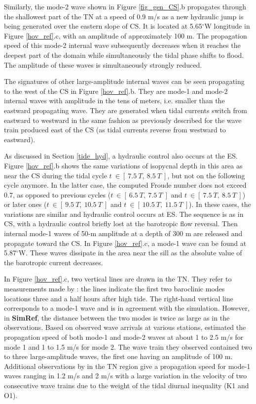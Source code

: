 Similarly, the mode-2 wave shown in Figure \ref{fig_gen_CS}.b propagates through the shallowest part of the TN at a speed of 0.9 m/s as a new hydraulic jump is being generated over the eastern slope of CS. It is located at 5.65$^\circ$W longitude in Figure \ref{hov_ref}.c, with an amplitude of approximately 100 m. The propagation speed of this mode-2 internal wave subsequently decreases when it reaches the deepest part of the domain while simultaneously the tidal phase shifts to flood. The amplitude of these waves is simultaneously strongly reduced.

The signatures of other large-amplitude internal waves can be seen propagating to the west of the CS in Figure \ref{hov_ref}.b. They are mode-1 and mode-2 internal waves with amplitude in the tens of meters, i.e. smaller than the eastward propagating wave. They are generated when tidal currents switch from eastward to westward in the same fashion as previously described for the wave train produced east of the CS (as tidal currents reverse from westward to eastward).

As discussed in Section \ref{tide_hyd}, a hydraulic control also occurs at the ES. Figure \ref{hov_ref}.b shows the same variations of  isopycnal depth in this area as near the CS during the tidal cycle $t\ \in [\ 7.5\ T,\ 8.5\ T\ ]$, but not on the following cycle anymore. In the latter case, the computed Froude number does not exceed 0.7, as opposed to previous cycles ($t\ \in[\ 6.5\ T,\ 7.5\ T\ ]$ and $t\ \in[\ 7.5\ T,\ 8.5\ T\ ]$) or later ones ($t\ \in[\ 9.5\ T,\ 10.5\ T\ ]$ and  $t\ \in[\ 10.5\ T,\ 11.5\ T\ ]$). In these cases, the variations are similar and hydraulic control occurs at ES. The sequence is as in CS, with a hydraulic control briefly lost at the barotropic flow reversal. Then internal mode-1 waves of 50-m amplitude at a depth of 300 m are released and propagate toward the CS. In Figure \ref{hov_ref}.c, a mode-1 wave can be found at 5.87$^\circ$W. These waves dissipate in the area near the sill as the absolute value of the barotropic current decreases.

In Figure \ref{hov_ref}.c, two vertical lines are drawn in the TN. They refer to measurements made by \citet{FA1988}: the lines indicate the first two baroclinic modes locations three and a half hours after high tide. The right-hand vertical line corresponds to a mode-1 wave and is in agreement with the simulation. However, in \textbf{SimRef}, the distance between the two modes is twice as large as in the observations. Based on observed wave arrivals at various stations, \citet{FA1988} estimated the propagation speed of both mode-1 and mode-2 waves at about 1 to 2.5 m/s for mode 1 and 1 to 1.5 m/s for mode 2. The wave train they observed contained two to three large-amplitude waves, the first one having an amplitude of 100 m. Additional observations by \citet{SG2008} in the TN region give a propagation speed for mode-1 waves ranging in 1.2 m/s and 2 m/s with a large variation in the velocity of two consecutive wave trains due to the weight of the tidal diurnal inequality (K1 and O1).

